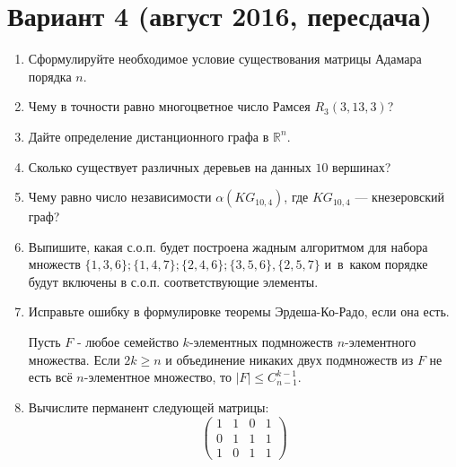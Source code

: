 \documentclass[oneside]{book}
\begin{document}
\section{Вариант 4 (август 2016, пересдача)}
\begin{enumerate}
\item Сформулируйте необходимое условие существования матрицы Адамара порядка $n$.
\item Чему в точности равно многоцветное число Рамсея $R_3(3, 13, 3)$?
\item Дайте определение дистанционного графа в $\mathbb{R}^n$.
\item Сколько существует различных деревьев на данных $10$ вершинах?
\item Чему равно число независимости $\alpha(KG_{10, 4})$, где $KG_{10, 4}$ --- кнезеровский граф?
\item Выпишите, какая с.о.п. будет построена жадным алгоритмом для набора множеств $\{1,3,6\}; \{1,4,7\}; \{2,4,6\}; \{3,5,6\},\{2,5,7\}$ и~в~каком порядке будут включены в с.о.п. соответствующие элементы.
\item Исправьте ошибку в формулировке теоремы Эрдеша-Ко-Радо, если она есть.

Пусть $F$ - любое семейство $k$-элементных подмножеств $n$-элементного множества. Если $2k \geqslant n$ и объединение никаких двух подмножеств из $F$ не есть всё $n$-элементное множество, то $|F| \leqslant C_{n-1}^{k-1}$.
\item Вычислите перманент следующей матрицы: 
$$\begin{pmatrix}
1 & 1 & 0 & 1 \\
0 & 1 & 1 & 1 \\
1 & 0 & 1 & 1
\end{pmatrix}
$$
\end{enumerate}
\end{document}

